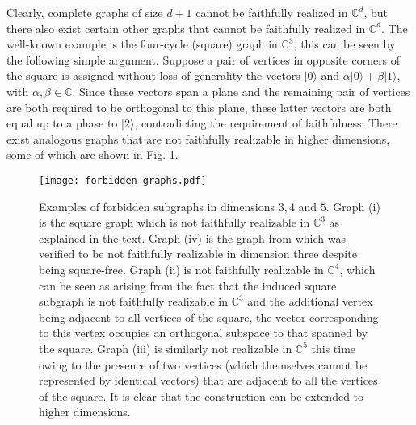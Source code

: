 \documentclass[twocolumn, a4paper, superscriptaddress,nofootinbib, accepted=2020-08-07, hyperref]{quantumarticle}
\def\tred{\textcolor{red}}
\begin{document}
Clearly, complete graphs of size $d+1$ cannot be faithfully realized in $\mathbb{C}^d$, but there also exist certain other graphs that cannot be faithfully realized in $\mathbb{C}^d$. The well-known example is the four-cycle (square) graph in $\mathbb{C}^3$, this can be seen by the following simple argument. Suppose a pair of vertices in opposite corners of the square is assigned without loss of generality the vectors $| 0 \rangle$ and $\alpha |0 \rangle + \beta | 1 \rangle$, with $\alpha, \beta \in \mathbb{C}$. Since these vectors span a plane and the remaining pair of vertices are both required to be orthogonal to this plane, these latter vectors are both equal up to a phase to $| 2 \rangle$, contradicting the requirement of faithfulness. There exist analogous graphs that are not faithfully realizable in higher dimensions, some of which are shown in Fig. \ref{fig:forbidden-graphs}. 
\begin{figure}
	\centerline{\texttt{[image: forbidden-graphs.pdf]}}
	\caption{Examples of forbidden subgraphs in dimensions $3,4$ and $5$. Graph (i) is the square graph which is not faithfully realizable in $\mathbb{C}^3$ as explained in the text. Graph (iv) is the graph from \cite{C11} which was verified to be not faithfully realizable in dimension three despite being square-free. Graph (ii) is not faithfully realizable in $\mathbb{C}^4$, which can be seen as arising from the fact that the induced square subgraph is not faithfully realizable in $\mathbb{C}^3$ and the additional vertex being adjacent to all vertices of the square, the vector corresponding to this vertex occupies an orthogonal subspace to that spanned by the square. Graph (iii) is similarly not realizable in $\mathbb{C}^5$ this time owing to the presence of two vertices (which themselves cannot be represented by identical vectors) that are adjacent to all the vertices of the square. It is clear that the construction can be extended to higher dimensions.}
	\label{fig:forbidden-graphs}
\end{figure} 
\end{document}
